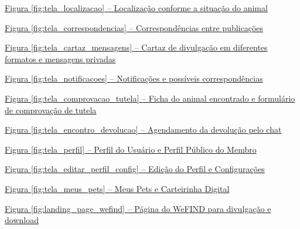 \noindent \hyperref[fig:tela_localizacao]{Figura \ref*{fig:tela_localizacao} -- Localização conforme a situação do animal \dotfill \pageref{fig:tela_localizacao}}\par\vspace{0.12cm}
\noindent \hyperref[fig:tela_correspondencias]{Figura \ref*{fig:tela_correspondencias} -- Correspondências entre publicações \dotfill \pageref{fig:tela_correspondencias}}\par\vspace{0.12cm}
\noindent \hyperref[fig:tela_cartaz_mensagens]{Figura \ref*{fig:tela_cartaz_mensagens} -- Cartaz de divulgação em diferentes formatos e mensagens privadas \dotfill \pageref{fig:tela_cartaz_mensagens}}\par\vspace{0.12cm}
\noindent \hyperref[fig:tela_notificacoes]{Figura \ref*{fig:tela_notificacoes} -- Notificações e possíveis correspondências \dotfill \pageref{fig:tela_notificacoes}}\par\vspace{0.12cm}
\noindent \hyperref[fig:tela_comprovacao_tutela]{Figura \ref*{fig:tela_comprovacao_tutela} -- Ficha do animal encontrado e formulário de comprovação de tutela \dotfill \pageref{fig:tela_comprovacao_tutela}}\par\vspace{0.12cm}
\noindent \hyperref[fig:tela_encontro_devolucao]{Figura \ref*{fig:tela_encontro_devolucao} -- Agendamento da devolução pelo chat \dotfill \pageref{fig:tela_encontro_devolucao}}\par\vspace{0.12cm}
\noindent \hyperref[fig:tela_perfil]{Figura \ref*{fig:tela_perfil} -- Perfil do Usuário e Perfil Público do Membro \dotfill \pageref{fig:tela_perfil}}\par\vspace{0.12cm}
\noindent \hyperref[fig:tela_editar_perfil_config]{Figura \ref*{fig:tela_editar_perfil_config} -- Edição do Perfil e Configurações \dotfill \pageref{fig:tela_editar_perfil_config}}\par\vspace{0.12cm}
\noindent \hyperref[fig:tela_meus_pets]{Figura \ref*{fig:tela_meus_pets} -- Meus Pets e Carteirinha Digital \dotfill \pageref{fig:tela_meus_pets}}\par\vspace{0.12cm}
\noindent \hyperref[fig:landing_page_wefind]{Figura \ref*{fig:landing_page_wefind} -- Página do WeFIND para divulgação e download \dotfill \pageref{fig:landing_page_wefind}}\par\vspace{0.12cm}
